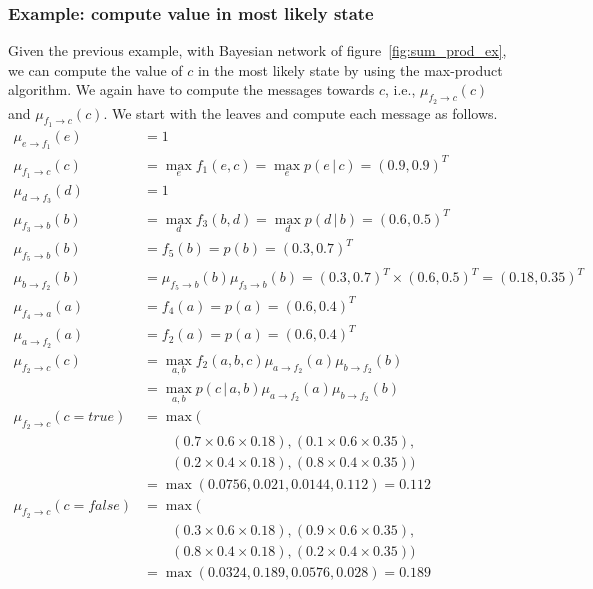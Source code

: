 \documentclass{article}
\newcommand{\giv}{\,|\,}
\begin{document}
\subsubsection{Example: compute value in most likely state}
Given the previous example, with Bayesian network of figure~\ref{fig:sum_prod_ex}, we can compute the value of $c$ in the most likely state by using the max-product algorithm. We again have to compute the messages towards $c$, i.e., $\mu_{f_2 \rightarrow c}(c)$ and $\mu_{f_1 \rightarrow c}(c)$. We start with the leaves and compute each message as follows. 
\begin{align*}
    \mu_{e \rightarrow f_1}(e) &= 1 \\ 
    \mu_{f_1 \rightarrow c}(c) &= \max_e f_1(e, c) = \max_e p(e \giv c) = (0.9, 0.9)^T \\
    \mu_{d \rightarrow f_3}(d) &= 1 \\ 
    \mu_{f_3 \rightarrow b}(b) &= \max_d f_3(b, d) = \max_d p(d \giv b) = (0.6, 0.5)^T \\
    \mu_{f_5 \rightarrow b}(b) &= f_5(b) = p(b) = (0.3, 0.7)^T \\
    \mu_{b \rightarrow f_2}(b) &= \mu_{f_5 \rightarrow b}(b) \mu_{f_3 \rightarrow b}(b) = (0.3, 0.7)^T \times (0.6, 0.5)^T = (0.18, 0.35)^T \\
    \mu_{f_4 \rightarrow a}(a) &= f_4(a) = p(a) = (0.6, 0.4)^T \\ 
    \mu_{a \rightarrow f_2}(a) &= f_2(a) = p(a) = (0.6, 0.4)^T \\
    \mu_{f_2 \rightarrow c}(c) &= \max_{a, b} f_2(a, b, c) \mu_{a \rightarrow f_2}(a) \mu_{b \rightarrow f_2}(b)\\
    &= \max_{a, b} p(c \giv a, b) \mu_{a \rightarrow f_2}(a) \mu_{b \rightarrow f_2}(b)\\
    \mu_{f_2 \rightarrow c}(c = true) &= \max(\\
    &\qquad ( 0.7 \times 0.6 \times 0.18), (0.1 \times 0.6 \times 0.35),\\ 
    &\qquad ( 0.2 \times 0.4 \times 0.18), (0.8 \times 0.4 \times 0.35)) \\
    &= \max(0.0756, 0.021, 0.0144, 0.112) = 0.112\\
    \mu_{f_2 \rightarrow c}(c = false) &= \max(\\
    &\qquad ( 0.3 \times 0.6 \times 0.18), (0.9 \times 0.6 \times 0.35),\\ 
    &\qquad ( 0.8 \times 0.4 \times 0.18), (0.2 \times 0.4 \times 0.35)) \\
    &= \max(0.0324, 0.189, 0.0576, 0.028) = 0.189
\end{align*}
\end{document}
